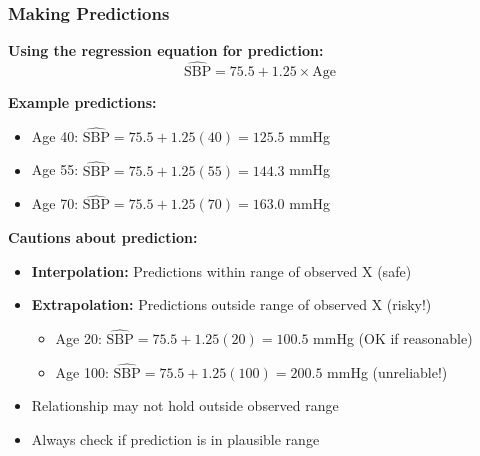\documentclass{beamer}
\begin{document}
\begin{frame}
\frametitle{Making Predictions}
\textbf{Using the regression equation for prediction:}
$$\widehat{\text{SBP}} = 75.5 + 1.25 \times \text{Age}$$

\vspace{0.3cm}
\textbf{Example predictions:}
\begin{itemize}
\item Age 40: $\widehat{\text{SBP}} = 75.5 + 1.25(40) = 125.5$ mmHg
\item Age 55: $\widehat{\text{SBP}} = 75.5 + 1.25(55) = 144.3$ mmHg
\item Age 70: $\widehat{\text{SBP}} = 75.5 + 1.25(70) = 163.0$ mmHg
\end{itemize}

\vspace{0.5cm}
\textbf{Cautions about prediction:}
\begin{itemize}
\item \textbf{Interpolation:} Predictions within range of observed X (safe)
\item \textbf{Extrapolation:} Predictions outside range of observed X (risky!)
  \begin{itemize}
  \item Age 20: $\widehat{\text{SBP}} = 75.5 + 1.25(20) = 100.5$ mmHg (OK if reasonable)
  \item Age 100: $\widehat{\text{SBP}} = 75.5 + 1.25(100) = 200.5$ mmHg (unreliable!)
  \end{itemize}
\item Relationship may not hold outside observed range
\item Always check if prediction is in plausible range
\end{itemize}
\end{frame}
\end{document}
